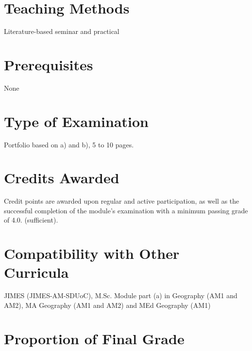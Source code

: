 \documentclass[
  letterpaper,
  10pt,
  openany]{book}
\begin{document}
\section*{Teaching Methods}\label{teaching-methods-1}


Literature-based seminar and practical

\section*{Prerequisites}\label{prerequisites-1}


None

\section*{Type of Examination}\label{type-of-examination-1}


Portfolio based on a) and b), 5 to 10 pages.

\section*{Credits Awarded}\label{credits-awarded-1}


Credit points are awarded upon regular and active participation, as well
as the successful completion of the module's examination with a minimum
passing grade of 4.0. (sufficient).

\section*{Compatibility with Other
Curricula}\label{compatibility-with-other-curricula-1}


JIMES (JIMES-AM-SDUoC), M.Sc. Module part (a) in Geography (AM1 and
AM2), MA Geography (AM1 and AM2) and MEd Geography (AM1)

\section*{Proportion of Final Grade}\label{proportion-of-final-grade-1}
\end{document}
